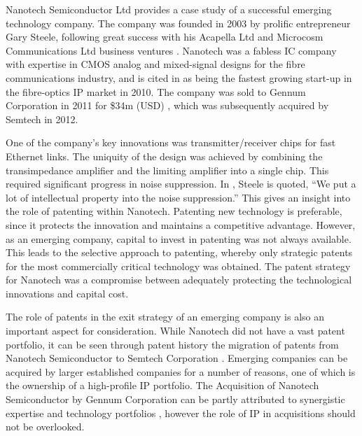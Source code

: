 {}
Nanotech Semiconductor Ltd provides a case study of a successful emerging technology company. 
The company was founded in 2003 by prolific entrepreneur Gary Steele, following great success with his Acapella Ltd and Microcosm Communications Ltd business ventures \cite{GazNesta}.
Nanotech was a fabless IC company with expertise in CMOS analog and mixed-signal designs for the fibre communications industry, and is cited in \cite{GazLightwave} as being the fastest growing start-up in the fibre-optics IP market in 2010.
The company was sold to Gennum Corporation in 2011 for \$34m (USD) \cite{GazBloom}, which was subsequently acquired by Semtech in 2012.
 
One of the company's key innovations was transmitter/receiver chips for fast Ethernet links.
The uniquity of the design was achieved by combining the transimpedance amplifier and the limiting amplifier into a single chip.
This required significant progress in noise suppression.
In \cite{GazEW}, Steele is quoted, ``We put a lot of intellectual property into the noise suppression.''
This gives an insight into the role of patenting within Nanotech.
Patenting new technology is preferable, since it protects the innovation and maintains a competitive advantage.
However, as an emerging company, capital to invest in patenting was not always available.
This leads to the selective approach to patenting, whereby only strategic patents for the most commercially critical technology was obtained.
The patent strategy for Nanotech was a compromise between adequately protecting the technological innovations and capital cost.

The role of patents in the exit strategy of an emerging company is also an important aspect for consideration.
While Nanotech did not have a vast patent portfolio, it can be seen through patent history the migration of patents from Nanotech Semiconductor to Semtech Corporation \cite{nuttgens2013closed1} \cite{nuttgens2013closed2}.
Emerging companies can be acquired by larger established companies for a number of reasons, one of which is the ownership of a high-profile IP portfolio.
The Acquisition of Nanotech Semiconductor by Gennum Corporation can be partly attributed to synergistic expertise and technology portfolios \cite{GazBloom}, however the role of IP in acquisitions should not be overlooked.
 
